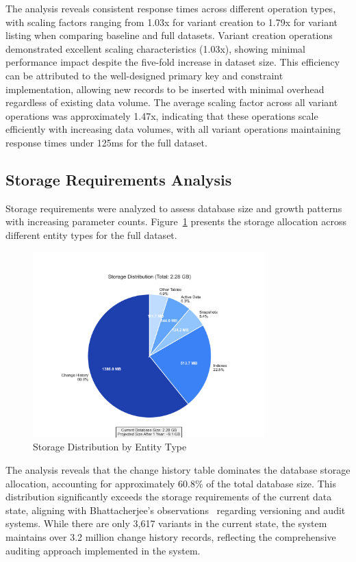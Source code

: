 The analysis reveals consistent response times across different operation types, with scaling factors ranging from 1.03x for variant creation to 1.79x for variant listing when comparing baseline and full datasets. Variant creation operations demonstrated excellent scaling characteristics (1.03x), showing minimal performance impact despite the five-fold increase in dataset size. This efficiency can be attributed to the well-designed primary key and constraint implementation, allowing new records to be inserted with minimal overhead regardless of existing data volume. The average scaling factor across all variant operations was approximately 1.47x, indicating that these operations scale efficiently with increasing data volumes, with all variant operations maintaining response times under 125ms for the full dataset.

\subsection{Storage Requirements Analysis}
\label{subsec:storage-requirements-analysis}

Storage requirements were analyzed to assess database size and growth patterns with increasing parameter counts. Figure~\ref{fig:storage-analysis} presents the storage allocation across different entity types for the full dataset.

\begin{figure}[h]
    \centering
    \includegraphics[width=0.8\textwidth]{figures/storage_distribution.png}
    \caption{Storage Distribution by Entity Type}
    \label{fig:storage-analysis}
\end{figure}

The analysis reveals that the change history table dominates the database storage allocation, accounting for approximately 60.8\% of the total database size. This distribution significantly exceeds the storage requirements of the current data state, aligning with Bhattacherjee's observations~\cite{bhattacherjee2015principles} regarding versioning and audit systems. While there are only 3,617 variants in the current state, the system maintains over 3.2 million change history records, reflecting the comprehensive auditing approach implemented in the system.

